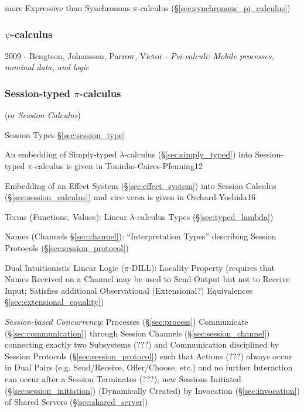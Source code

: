 more Expressive than Synchronous $\pi$-calculus
(\S\ref{sec:synchronous_pi_calculus})



\subsubsection{$\psi$-calculus}\label{sec:psi_calculus}

2009 - Bengtson, Johansson, Parrow, Victor - \emph{Psi-calculi: Mobile
  processes, nominal data, and logic}



\subsubsection{Session-typed $\pi$-calculus}
\label{sec:sessiontyped_pi}
\cite{honda-vasconcelos-kubo98}
\cite{caires-pfenning10}
\cite{caires-pfenning-toninho12}

(or \emph{Session Calculus})

Session Types \S\ref{sec:session_type}

\fist An embedding of Simply-typed $\lambda$-calculus
(\S\ref{sec:simply_typed}) into Session-typed $\pi$-calculus is given
in Toninho-Caires-Pfenning12 \cite{caires-pfenning-toninho12}

\fist Embedding of an Effect System (\S\ref{sec:effect_system}) into
Session Calculus (\S\ref{sec:session_calculus}) and vice versa is
given in Orchard-Yoshida16 \cite{orchard-yoshida16}

Terms (Functions, Values): Linear $\lambda$-calculus Types
(\S\ref{sec:typed_lambda})

Names (Channels \S\ref{sec:channel}): ``Interpretation Types''
describing Session Protocols (\S\ref{sec:session_protocol})

Dual Intuitionistic Linear Logic ($\pi$-DILL):
\cite{caires-pfenning10} Locality Property (requires that Names
Received on a Channel may be used to Send Output but not to Receive
Input; Satisfies additional Observational (Extensional?) Equivalences
\S\ref{sec:extensional_equality}) \cite{wadler12}

\emph{Session-based Concurrency}: Processes (\S\ref{sec:process})
Communicate (\S\ref{sec:communication}) through Session Channels
(\S\ref{sec:session_channel}) connecting exactly two Subsystems (???)
and Communication disciplined by Session Protocols
(\S\ref{sec:session_protocol}) such that Actions (???) always occur in
Dual Pairs (e.g. Send/Receive, Offer/Choose, etc.) and no further
Interaction can occur after a Session Terminates (???), new Sessions
Initiated (\S\ref{sec:session_initiation}) (Dynamically Created) by
Invocation (\S\ref{sec:invocation}) of Shared Servers
(\S\ref{sec:shared_server}) \cite{caires-pfenning10}

